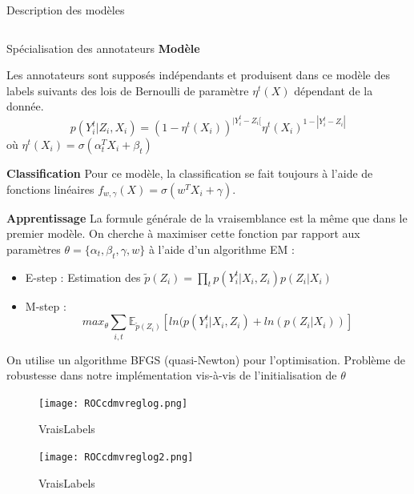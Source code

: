 \documentclass[final]{beamer}
\newlength{\onecolwid}
\newlength{\twocolwid}
\begin{document}
\begin{frame}[t]
\begin{columns}[t]
\begin{column}{\twocolwid}
\begin{block}{Description des modèles}
\begin{columns}[t,totalwidth=\twocolwid]
\begin{column}{\onecolwid}
\begin{alertblock}{Spécialisation des annotateurs}
\newline
\textbf{Modèle}

Les annotateurs sont supposés indépendants et produisent dans ce modèle des labels suivants des lois de Bernoulli de paramètre $\eta^t(X)$ dépendant de la donnée.
$$ p(Y_i^t | Z_i,X_i) = (1-\eta^t(X_i))^{|Y_i^t - Z_i[} {\eta^t(X_i)}^{1-|Y_i^t-Z_i|} $$
\noindent où $\eta^t(X_i) = \sigma(\alpha_t^T X_i+\beta_t) $
\\
\vspace{0.4cm}

\textbf{Classification} Pour ce modèle, la classification se fait toujours à l'aide de fonctions linéaires $f_{w,\gamma}(X) = \sigma({w^T X_i + \gamma}) $.

\textbf{Apprentissage}
La formule générale de la vraisemblance est la même que dans le premier modèle. On cherche à maximiser cette fonction par rapport aux paramètres $\theta = \{\alpha_t, \beta_t, \gamma, w \}$ à l'aide d'un algorithme EM :
\begin{itemize}

\item E-step : Estimation des $\widetilde{p}(Z_i) = \prod _t p(Y_i^t|X_i,Z_i)p(Z_i|X_i)$

\item M-step :
$$ max_\theta \displaystyle \sum_{i,t} \mathbb{E}_{\widetilde{p}(Z_i)} [ ln(p(Y_i^t|X_i,Z_i) + ln(p(Z_i|X_i))] $$


\end{itemize}

On utilise un algorithme BFGS (quasi-Newton) pour l'optimisation.
Problème de robustesse dans notre implémentation vis-à-vis de l'initialisation de $\theta$

\end{alertblock}
\begin{minipage}{0.5\textwidth}
    \begin{figure}
    \centering
    \texttt{[image: ROCcdmvreglog.png]}
    \caption{VraisLabels}
    \label{fig:my_label}
\end{figure}
    \end{minipage}

    \begin{minipage}{1.6\textwidth}
\vspace{-13.5cm}
    \begin{figure}
        \centering
        \texttt{[image: ROCcdmvreglog2.png]}
        \caption{VraisLabels}
        \label{fig:my_label}
    \end{figure}
    \end{minipage}




\end{column}
\end{columns}
\end{block}
\end{column}
\end{columns}
\end{frame}
\end{document}
